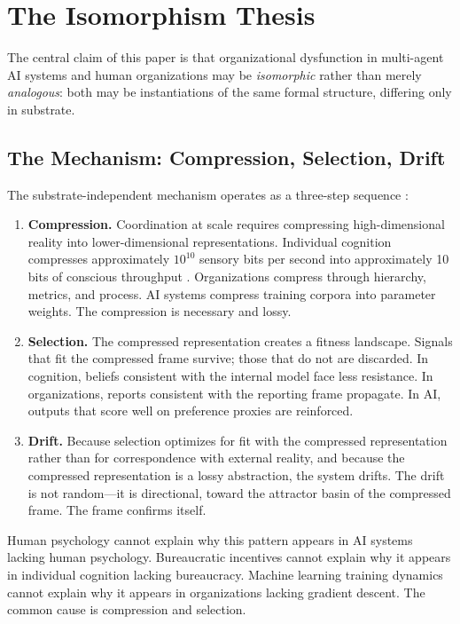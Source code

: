 \documentclass[11pt,a4paper]{article}
\begin{document}
\section{The Isomorphism Thesis}
\label{sec:isomorphism}

The central claim of this paper is that organizational dysfunction in multi-agent AI systems and human organizations may be \emph{isomorphic} rather than merely \emph{analogous}: both may be instantiations of the same formal structure, differing only in substrate.

\subsection{The Mechanism: Compression, Selection, Drift}

The substrate-independent mechanism operates as a three-step sequence \citep{mcentire2025d}:

\begin{enumerate}
\item \textbf{Compression.} Coordination at scale requires compressing high-dimensional reality into lower-dimensional representations. Individual cognition compresses approximately $10^{10}$ sensory bits per second into approximately 10 bits of conscious throughput \citep{zheng2025}. Organizations compress through hierarchy, metrics, and process. AI systems compress training corpora into parameter weights. The compression is necessary and lossy.

\item \textbf{Selection.} The compressed representation creates a fitness landscape. Signals that fit the compressed frame survive; those that do not are discarded. In cognition, beliefs consistent with the internal model face less resistance. In organizations, reports consistent with the reporting frame propagate. In AI, outputs that score well on preference proxies are reinforced.

\item \textbf{Drift.} Because selection optimizes for fit with the compressed representation rather than for correspondence with external reality, and because the compressed representation is a lossy abstraction, the system drifts. The drift is not random---it is directional, toward the attractor basin of the compressed frame. The frame confirms itself.
\end{enumerate}

Human psychology cannot explain why this pattern appears in AI systems lacking human psychology. Bureaucratic incentives cannot explain why it appears in individual cognition lacking bureaucracy. Machine learning training dynamics cannot explain why it appears in organizations lacking gradient descent. The common cause is compression and selection.
\end{document}
